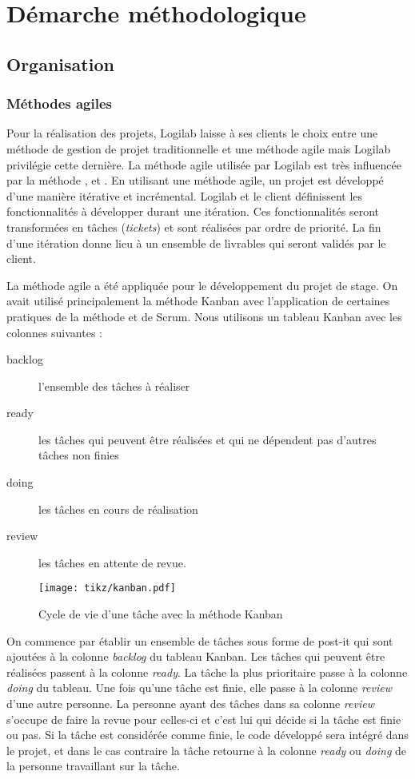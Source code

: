 \chapter{Démarche méthodologique} 
\section{Organisation} 
\subsection{Méthodes agiles} 
Pour la réalisation des projets, Logilab laisse à ses clients le choix
entre une méthode de gestion de projet traditionnelle et une méthode agile mais
Logilab privilégie cette dernière. La méthode agile utilisée par Logilab est
très influencée par la méthode , 
et . En utilisant une méthode agile, un projet est
développé d'une manière itérative et incrémental. Logilab et le client
définissent les fonctionnalités à développer durant une itération. Ces
fonctionnalités seront transformées en tâches (\textit{tickets}) et sont
réalisées par ordre de priorité. La fin d'une itération donne lieu à un
ensemble de livrables qui seront validés par le client. 

La méthode agile a été appliquée pour le développement du projet de stage. On
avait utilisé principalement la méthode Kanban avec l'application de certaines
pratiques de la méthode  et de Scrum. Nous utilisons un tableau
Kanban avec les colonnes suivantes : 

\begin{description} 
    \item[backlog] l'ensemble des tâches à réaliser 
    \item[ready] les tâches qui peuvent être réalisées et qui ne dépendent pas 
        d'autres tâches non finies
    \item[doing] les tâches en cours de réalisation 
    \item[review] les tâches en attente de revue.  
\end{description} 

\begin{figure} 
    \centering
    \texttt{[image: tikz/kanban.pdf]} 
    \caption{Cycle de vie d'une tâche avec la méthode Kanban} 
    \label{fig:kanban} 
\end{figure}
        
On commence par établir un ensemble de tâches sous forme de post-it qui sont 
ajoutées à la colonne \textit{backlog} du tableau Kanban. Les tâches qui peuvent 
être réalisées passent à la colonne \textit{ready}. La tâche la plus prioritaire 
passe à la colonne \textit{doing} du tableau. Une fois qu'une tâche est finie, 
elle passe à la colonne \textit{review} d'une autre personne. La personne ayant 
des tâches dans sa colonne \textit{review} s'occupe de faire la revue pour 
celles-ci et c'est lui qui décide si la tâche est finie ou pas. Si la tâche est
considérée comme finie, le code développé sera intégré dans le projet, et dans 
le cas contraire la tâche retourne à la colonne \textit{ready} ou \textit{doing} 
de la personne travaillant sur la tâche. 

